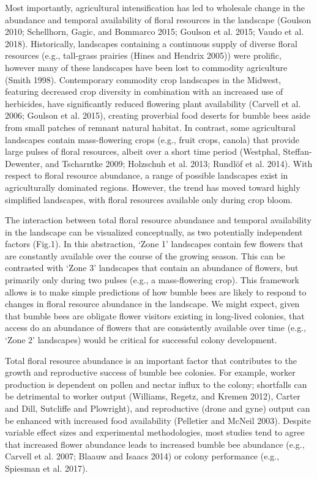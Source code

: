\documentclass[11pt,]{article}
\begin{document}
Most importantly, agricultural intensification has led to wholesale
change in the abundance and temporal availability of floral resources in
the landscape (Goulson 2010; Schellhorn, Gagic, and Bommarco 2015;
Goulson et al. 2015; Vaudo et al. 2018). Historically, landscapes
containing a continuous supply of diverse floral resources (e.g.,
tall-grass prairies (Hines and Hendrix 2005)) were prolific, however
many of these landscapes have been lost to commodity agriculture (Smith
1998). Contemporary commodity crop landscapes in the Midwest, featuring
decreased crop diversity in combination with an increased use of
herbicides, have significantly reduced flowering plant availability
(Carvell et al. 2006; Goulson et al. 2015), creating proverbial food
deserts for bumble bees aside from small patches of remnant natural
habitat. In contrast, some agricultural landscapes contain
mass-flowering crops (e.g., fruit crops, canola) that provide large
pulses of floral resources, albeit over a short time period (Westphal,
Steffan-Dewenter, and Tscharntke 2009; Holzschuh et al. 2013; Rundlöf et
al. 2014). With respect to floral resource abundance, a range of
possible landscapes exist in agriculturally dominated regions. However,
the trend has moved toward highly simplified landscapes, with floral
resources available only during crop bloom.

The interaction between total floral resource abundance and temporal
availability in the landscape can be visualized conceptually, as two
potentially independent factors (Fig.1). In this abstraction, `Zone 1'
landscapes contain few flowers that are constantly available over the
course of the growing season. This can be contrasted with `Zone 3'
landscapes that contain an abundance of flowers, but primarily only
during two pulses (e.g., a mass-flowering crop). This framework allows
is to make simple predictions of how bumble bees are likely to respond
to changes in floral resource abundance in the landscape. We might
expect, given that bumble bees are obligate flower visitors existing in
long-lived colonies, that access do an abundance of flowers that are
consistently available over time (e.g., `Zone 2' landscapes) would be
critical for successful colony development.

Total floral resource abundance is an important factor that contributes
to the growth and reproductive success of bumble bee colonies. For
example, worker production is dependent on pollen and nectar influx to
the colony; shortfalls can be detrimental to worker output (Williams,
Regetz, and Kremen 2012), Carter and Dill, Sutcliffe and Plowright), and
reproductive (drone and gyne) output can be enhanced with increased food
availability (Pelletier and McNeil 2003). Despite variable effect sizes
and experimental methodologies, most studies tend to agree that
increased flower abundance leads to increased bumble bee abundance
(e.g., Carvell et al. 2007; Blaauw and Isaacs 2014) or colony
performance (e.g., Spiesman et al. 2017).
\end{document}
